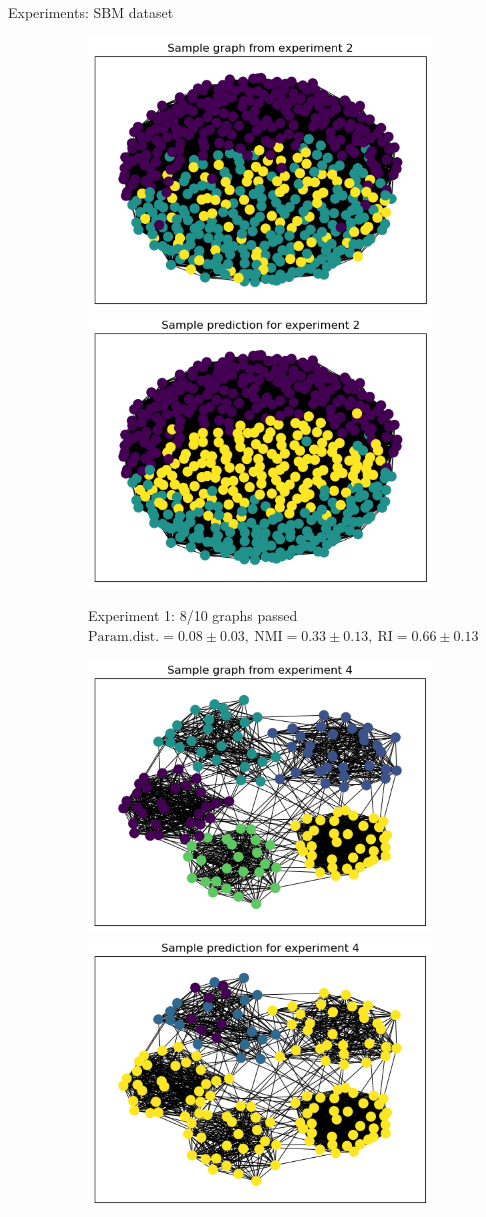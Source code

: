 \documentclass[final]{beamer}
\newlength{\colwidth}
\begin{document}
\begin{frame}[t]
\begin{columns}[t]
\begin{column}{\colwidth}
\begin{block}{Experiments: SBM dataset}
        \begin{figure}[h]
          \begin{subfigure}{0.49\linewidth}
            \centering
            \includegraphics[width=0.49\linewidth, trim={5 5 5 18}, clip]{figures/exp2_sample.png}
            \includegraphics[width=0.49\linewidth, trim={5 5 5 18}, clip]{figures/exp2_pred.png}
            \caption{\centering Experiment 1: 8/10 graphs passed\\ $\mathrm{Param. dist.} = 0.08 \pm 0.03, \ \mathrm{NMI} = 0.33 \pm 0.13, \ \mathrm{RI} = 0.66 \pm 0.13$}
            \label{fig:exp1}
          \end{subfigure}
          \hfill
          \begin{subfigure}{0.49\linewidth}
            \centering
            \includegraphics[width=0.49\linewidth, trim={5 5 5 18}, clip]{figures/exp4_sample.png}
            \includegraphics[width=0.49\linewidth, trim={5 5 5 18}, clip]{figures/exp4_pred.png}

\end{subfigure}
\end{figure}
\end{block}
\end{column}
\end{columns}
\end{frame}
\end{document}
